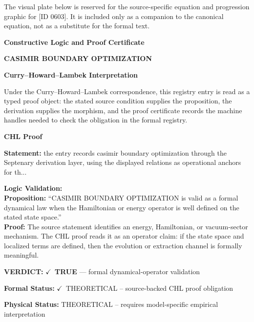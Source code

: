 \begingroup\footnotesize\sloppy
The visual plate below is reserved for the source-specific equation and progression graphic for [ID 0603]. It is included only as a companion to the canonical equation, not as a substitute for the formal text.
\par\endgroup
\ifTZPDarkEdition
{}
\fi

\clearpage
\begingroup\tzpsupportsetup
\noindent\textbf{\fontsize{10.8pt}{12.8pt}\selectfont [ID 0603] Constructive Logic and Proof Certificate}\par
\noindent\textbf{\fontsize{10pt}{12pt}\selectfont CASIMIR BOUNDARY OPTIMIZATION}\par
\vspace{0.45em}
\begingroup
\footnotesize
\setlength{\parskip}{0.22em}
\setlength{\parindent}{0pt}
\noindent\textbf{Curry--Howard--Lambek Interpretation}\par
Under the Curry--Howard--Lambek correspondence, this registry entry is read as a typed proof
object: the stated source condition supplies the proposition, the derivation supplies the
morphism, and the proof certificate records the machine handles needed to check the obligation
in the formal registry.

\vspace{0.45em}
\noindent\textbf{CHL Proof}\par
\textbf{Statement:} the entry records casimir boundary optimization through the Septenary derivation layer,
using the displayed relations as operational anchors for th...

\textbf{Logic Validation:}\\
\textbf{Proposition:} ``CASIMIR BOUNDARY OPTIMIZATION is valid as a formal dynamical law when the Hamiltonian or
energy operator is well defined on the stated state space.''\\
\textbf{Proof:} The source statement identifies an energy, Hamiltonian, or vacuum-sector mechanism. The
CHL proof reads it as an operator claim: if the state space and localized terms are
defined, then the evolution or extraction channel is formally meaningful.

\textbf{VERDICT:} \ensuremath{\checkmark}\ \textbf{TRUE} --- formal dynamical-operator validation

\textbf{Formal Status:} \ensuremath{\checkmark}\ THEORETICAL -- source-backed CHL proof obligation

\textbf{Physical Status:} THEORETICAL -- requires model-specific empirical interpretation
\par\vspace{0.45em}
\par
\ifTZPDarkEdition
{}
\fi
\endgroup
\endgroup
